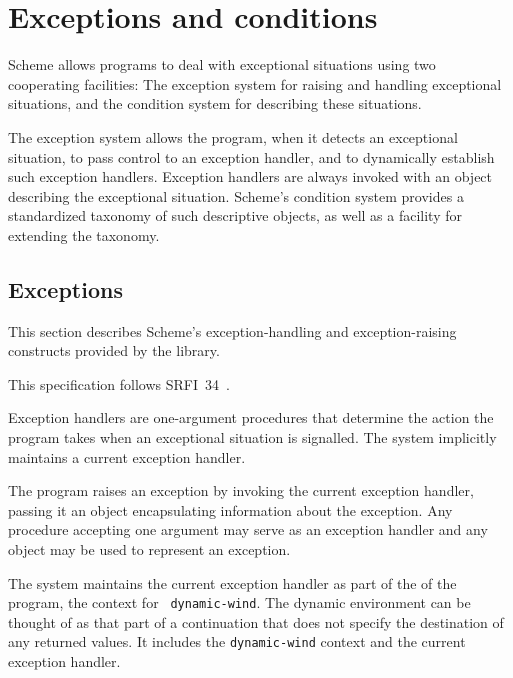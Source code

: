 \chapter{Exceptions and conditions}
\label{exceptionsconditionschapter}

Scheme allows programs to deal with exceptional situations using two
cooperating facilities: The exception system for raising and handling
exceptional situations, and the condition system for describing these
situations.

The exception system allows the program, when it detects an
exceptional situation, to pass control to an exception handler, and
to dynamically establish such exception handlers.  Exception
handlers are always invoked with an object describing the exceptional
situation.  Scheme's condition system provides a standardized taxonomy
of such descriptive objects, as well as a facility for extending the
taxonomy.

\section{Exceptions}
\label{exceptionssection}

This section describes Scheme's exception-handling and
exception-raising constructs provided by the  library.

\begin{note}
  This specification follows SRFI~34~\cite{srfi34}.
\end{note}

Exception handlers are one-argument procedures that determine the
action the program takes when an exceptional situation is signalled.
The system implicitly maintains a current exception handler.

The program raises an exception
by invoking the current exception handler, passing it an object
encapsulating information about the exception. Any procedure accepting
one argument may serve as an exception handler and any object may be
used to represent an exception.

The system maintains the current exception handler as part of the
 of the program, the context for {\tt
  dynamic-wind}. The dynamic environment can be thought of as that
part of a continuation that does not specify the destination of any
returned values. It includes the {\tt dynamic-wind} context and the
current exception handler.


